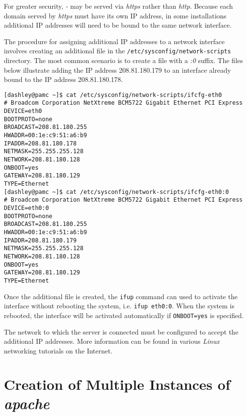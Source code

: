 For greater security, \emph{\productbasename{}-\productversion{}} may be 
served via \emph{https} rather than \emph{http}.  Because
each domain served by \emph{https} must have its own IP address, in some
installations additional IP addresses will need to be bound to the same
network interface.

The procedure for assigning additional IP addresses to a network
interface involves creating an additional file in the
\texttt{/etc/sysconfig/network-scripts} directory.
The most common scenario is to create a file with a \emph{:0} suffix.
The files below illustrate adding the IP address 208.81.180.179 to
an interface already bound to the IP address 208.81.180.178.

\begin{small}
\begin{verbatim}
[dashley@pamc ~]$ cat /etc/sysconfig/network-scripts/ifcfg-eth0
# Broadcom Corporation NetXtreme BCM5722 Gigabit Ethernet PCI Express
DEVICE=eth0
BOOTPROTO=none
BROADCAST=208.81.180.255
HWADDR=00:1e:c9:51:a6:b9
IPADDR=208.81.180.178
NETMASK=255.255.255.128
NETWORK=208.81.180.128
ONBOOT=yes
GATEWAY=208.81.180.129
TYPE=Ethernet
[dashley@pamc ~]$ cat /etc/sysconfig/network-scripts/ifcfg-eth0:0
# Broadcom Corporation NetXtreme BCM5722 Gigabit Ethernet PCI Express
DEVICE=eth0:0
BOOTPROTO=none
BROADCAST=208.81.180.255
HWADDR=00:1e:c9:51:a6:b9
IPADDR=208.81.180.179
NETMASK=255.255.255.128
NETWORK=208.81.180.128
ONBOOT=yes
GATEWAY=208.81.180.129
TYPE=Ethernet
\end{verbatim}
\end{small}

Once the additional file is created, the \texttt{ifup} command can
used to activate the interface without rebooting the system, i.e.
\texttt{ifup eth0:0}.  When the system is rebooted, the interface will
be activated automatically if \texttt{ONBOOT=yes} is specified.

The network to which the server is connected must be configured to
accept the additional IP addresses.  More information can be found
in various \emph{Linux} networking tutorials on the Internet.


\section{Creation of Multiple Instances of \emph{apache}}
\label{cist0:scmi0}


